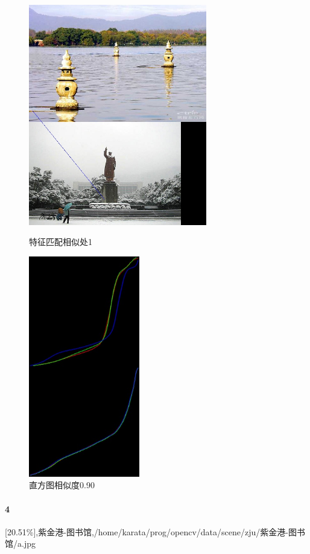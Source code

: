 \begin{figure}[htb]
\begin{minipage}[t]{0.5\linewidth}
\centering
\includegraphics[height=3.8in]{三映.jpg.d/im3sift.jpg}
\caption{特征匹配相似处1}
\label{fig:side:a}
\end{minipage}%
\begin{minipage}[t]{0.5\linewidth}
\centering
\includegraphics[height=3.8in]{三映.jpg.d/im3hist2.jpg}
\caption{直方图相似度0.90}
\label{fig:side:a}
\end{minipage}%
\end{figure}

\clearpage
\paragraph{4}
[20.51\%],紫金港-图书馆,/home/karata/prog/opencv/data/scene/zju/紫金港-图书馆/a.jpg

